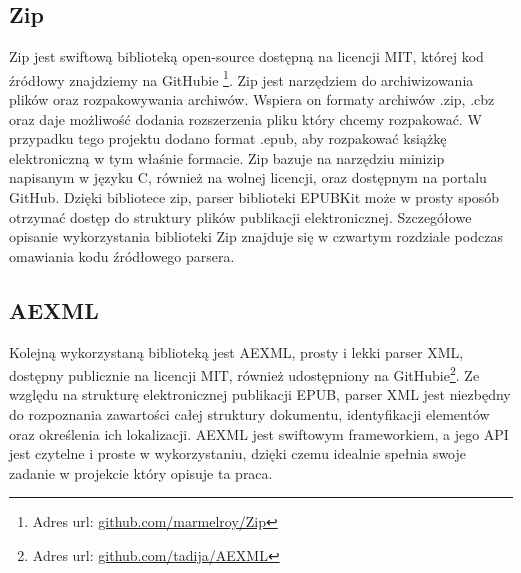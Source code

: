\subsection{Zip}

Zip jest swiftową biblioteką open-source dostępną na licencji MIT, której kod źródłowy znajdziemy na GitHubie \footnote{Adres url: \href{https://github.com/marmelroy/Zip}{github.com/marmelroy/Zip}}. Zip jest narzędziem do archiwizowania plików oraz rozpakowywania archiwów. Wspiera on formaty archiwów .zip, .cbz oraz daje możliwość dodania rozszerzenia pliku który chcemy rozpakować. W przypadku tego projektu dodano format .epub, aby rozpakować książkę elektroniczną w tym właśnie formacie. Zip bazuje na narzędziu minizip napisanym w języku C, również na wolnej licencji, oraz dostępnym na portalu GitHub. Dzięki bibliotece zip, parser biblioteki EPUBKit może w prosty sposób otrzymać dostęp do struktury plików publikacji elektronicznej. Szczegółowe opisanie wykorzystania biblioteki Zip znajduje się w czwartym rozdziale podczas omawiania kodu źródłowego parsera.

\subsection{AEXML}

Kolejną wykorzystaną biblioteką jest AEXML, prosty i lekki parser XML, dostępny publicznie na licencji MIT, również udostępniony na GitHubie\footnote{Adres url: \href{https://github.com/tadija/AEXML}{github.com/tadija/AEXML}}. Ze względu na strukturę elektronicznej publikacji EPUB, parser XML jest niezbędny do rozpoznania zawartości całej struktury dokumentu, identyfikacji elementów oraz określenia ich lokalizacji. AEXML jest swiftowym frameworkiem, a jego API jest czytelne i proste w wykorzystaniu, dzięki czemu idealnie spełnia swoje zadanie w projekcie który opisuje ta praca.

